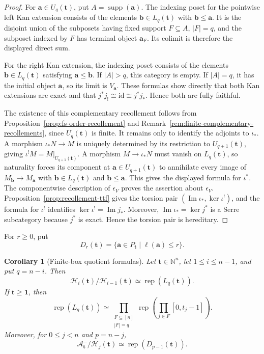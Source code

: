\documentclass[10pt,a4paper]{amsart}
\newtheorem{corollary}[theorem]{Corollary}
\newcommand{\Rep}{\operatorname{rep}}
\begin{document}
\begin{proof}
For $\mathbf a\in U_q(\mathbf t)$, put $A=\operatorname{supp}(\mathbf a)$.  The indexing poset for the pointwise left Kan extension consists of the elements $\mathbf b\in L_q(\mathbf t)$ with $\mathbf b\le\mathbf a$.  It is the disjoint union of the subposets having fixed support $F\subseteq A$, $|F|=q$, and the subposet indexed by $F$ has terminal object $\mathbf a_F$.  Its colimit is therefore the displayed direct sum.

For the right Kan extension, the indexing poset consists of the elements $\mathbf b\in L_q(\mathbf t)$ satisfying $\mathbf a\le\mathbf b$.  If $|A|>q$, this category is empty.  If $|A|=q$, it has the initial object $\mathbf a$, so its limit is $V_{\mathbf a}$.  These formulas show directly that both Kan extensions are exact and that $j^*j_!\cong\mathrm{id}\cong j^*j_*$.  Hence both are fully faithful.

The existence of this complementary recollement follows from
Proposition~\ref{prop:fs-order-recollement} and
Remark~\ref{rem:finite-complementary-recollements}, since
$U_q(\mathbf t)$ is finite.  It remains only to identify the adjoints to
$\iota_*$.  A morphism
$\iota_*N\to M$ is uniquely determined by its restriction to
$U_{q+1}(\mathbf t)$, giving
$\iota^!M=M|_{U_{q+1}(\mathbf t)}$.  A morphism $M\to\iota_*N$ must vanish
on $L_q(\mathbf t)$, so naturality forces its component at
$\mathbf a\in U_{q+1}(\mathbf t)$ to annihilate every image of
$M_{\mathbf b}\to M_{\mathbf a}$ with $\mathbf b\in L_q(\mathbf t)$ and
$\mathbf b\le\mathbf a$.  This gives the displayed formula for $\iota^*$.
The componentwise description of $\epsilon_V$ proves the assertion about
$\epsilon_V$.  Proposition~\ref{prop:recollement-ttf} gives the torsion pair
$(\operatorname{Im}\iota_*,\ker\iota^!)$, and the formula for $\iota^!$
identifies $\ker\iota^!=\operatorname{Im}j_*$.  Moreover,
$\operatorname{Im}\iota_*=\ker j^*$ is a Serre subcategory because $j^*$ is
exact.  Hence the torsion pair is hereditary.
\end{proof}


For $r\ge0$, put
\[
D_r(\mathbf t)=\{\mathbf a\in P_{\mathbf t}\mid\ell(\mathbf a)\le r\}.
\]

\begin{corollary}[Finite-box quotient formulas]
\label{cor:finite-quotient-formulas}
Let $\mathbf t\in\mathbb N^n$, let $1\le i\le n-1$, and put $q=n-i$.
Then
\[
\mathcal H_i(\mathbf t)/\mathcal H_{i-1}(\mathbf t)
\simeq\Rep(L_q(\mathbf t)).
\]
If $\mathbf t\ge\mathbf1$, then
\[
\Rep(L_q(\mathbf t))
\simeq
\prod_{\substack{F\subseteq[n]\\|F|=q}}
\Rep\left(\prod_{j\in F}[0,t_j-1]\right).
\]
Moreover, for $0\le j<n$ and $p=n-j$,
\begin{equation}\label{eq:finite-complementary-quotient}
\mathcal A^-_{\mathbf t}/\mathcal H_j(\mathbf t)
\simeq\Rep(D_{p-1}(\mathbf t)).
\end{equation}
\end{corollary}
\end{document}
